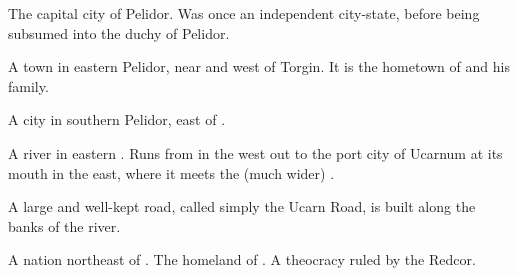 \begin{gloss}
\begin{subgloss}
  
  
  
  
  \begin{comment}
  \subparagraph{\Malcur}
  \end{comment}
  \gitem{\Malcur}
  \index{\Malcur}
  The capital city of Pelidor. 
  Was once an independent city-state, before being subsumed into the duchy of Pelidor. 
  
  
  
  
  
  \begin{comment}
  \subparagraph{\Redglen}
  \end{comment}
  \gitem{\Redglen}
  \index{\Redglen}
  A town in eastern Pelidor, near  and west of Torgin. 
  It is the hometown of  and his family. 
  
  
  
  
  
  \begin{comment}
  \subparagraph{Torgin}
  \end{comment}
  A city in southern Pelidor, east of \Redglen. 





  \begin{comment}
  \subparagraph{Ucarn}
  \end{comment}
  A river in eastern . 
  Runs from  in the west out to the port city of {Ucarnum} at its mouth in the east, where it meets the (much wider) . 
  
  A large and well-kept road, called simply the Ucarn Road, is built along the banks of the river. 
\end{subgloss}









\begin{comment}
\paragraph{\Redce}
\end{comment}
\gitem{\Redce}
\index{\Redce}
A nation northeast of \Velcad{}. 
The homeland of \ClanRedcor. 
A theocracy ruled by the Redcor. 








\end{gloss}
